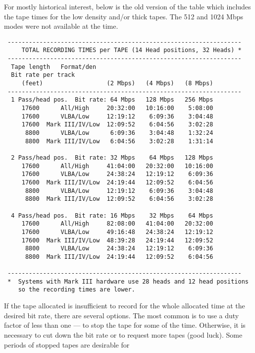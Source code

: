 \documentclass{report}
\begin{document}
For mostly historical interest, below is the old version of the
table which includes the tape times for the low density and/or
thick tapes.  The 512 and 1024 Mbps modes were not available
at the time.

\begin{verbatim}
 ------------------------------------------------------------------
     TOTAL RECORDING TIMES per TAPE (14 Head positions, 32 Heads) *
 ------------------------------------------------------------------
  Tape length   Format/den
  Bit rate per track
     (feet)                  (2 Mbps)   (4 Mbps)   (8 Mbps)
 ------------------------------------------------------------------
  1 Pass/head pos.  Bit rate: 64 Mbps   128 Mbps   256 Mbps
     17600      All/High     20:32:00   10:16:00    5:08:00
     17600      VLBA/Low     12:19:12    6:09:36    3:04:48
     17600  Mark III/IV/Low  12:09:52    6:04:56    3:02:28
      8800      VLBA/Low      6:09:36    3:04:48    1:32:24
      8800  Mark III/IV/Low   6:04:56    3:02:28    1:31:14

  2 Pass/head pos.  Bit rate: 32 Mbps    64 Mbps   128 Mbps
     17600      All/High     41:04:00   20:32:00   10:16:00
     17600      VLBA/Low     24:38:24   12:19:12    6:09:36
     17600  Mark III/IV/Low  24:19:44   12:09:52    6:04:56
      8800      VLBA/Low     12:19:12    6:09:36    3:04:48
      8800  Mark III/IV/Low  12:09:52    6:04:56    3:02:28

  4 Pass/head pos.  Bit rate: 16 Mbps    32 Mbps    64 Mbps
     17600      All/High     82:08:00   41:04:00   20:32:00
     17600      VLBA/Low     49:16:48   24:38:24   12:19:12
     17600  Mark III/IV/Low  48:39:28   24:19:44   12:09:52
      8800      VLBA/Low     24:38:24   12:19:12    6:09:36
      8800  Mark III/IV/Low  24:19:44   12:09:52    6:04:56

 ------------------------------------------------------------------
 *  Systems with Mark III hardware use 28 heads and 12 head positions
    so the recording times are lower.

\end{verbatim}

If the tape allocated is insufficient to record for the whole allocated
time at the desired bit rate, there are several options.  The most
common is to use a duty factor of less than one --- to stop the tape
for some of the time.  Otherwise, it is necessary to cut down the
bit rate or to request more tapes (good luck).  Some periods of stopped
tapes are desirable for 
\end{document}
